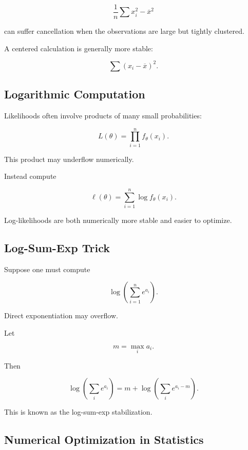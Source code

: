 \[
\frac1n\sum x_i^2
-
\overline{x}^2
\]

can suffer cancellation when the observations are large but tightly
clustered.

A centered calculation is generally more stable:

\[
\boxed{
\sum
(
x_i-\overline{x}
)^2.
}
\]

\subsection{Logarithmic Computation}
\label{subsec:logarithmic-computation}

Likelihoods often involve products of many small probabilities:

\[
\boxed{
L(\theta)
=
\prod_{i=1}^{n}
f_\theta(x_i).
}
\]

This product may underflow numerically.

Instead compute

\[
\boxed{
\ell(\theta)
=
\sum_{i=1}^{n}
\log
f_\theta(x_i).
}
\]

Log-likelihoods are both numerically more stable and easier to optimize.

\subsection{Log-Sum-Exp Trick}
\label{subsec:log-sum-exp}

Suppose one must compute

\[
\log
\left(
\sum_{i=1}^{n}
e^{a_i}
\right).
\]

Direct exponentiation may overflow.

Let

\[
m
=
\max_i a_i.
\]

Then

\[
\boxed{
\log
\left(
\sum_i e^{a_i}
\right)
=
m
+
\log
\left(
\sum_i
e^{a_i-m}
\right).
}
\]

This is known as the log-sum-exp stabilization.

\subsection{Numerical Optimization in Statistics}
\label{subsec:numerical-optimization-statistics}

